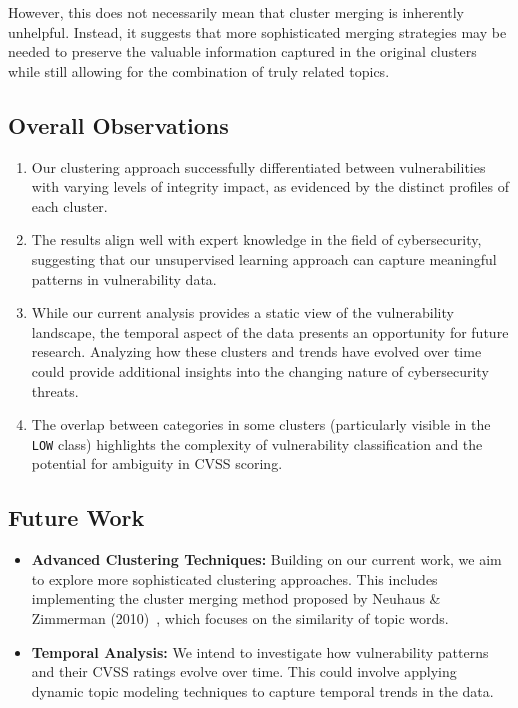 However, this does not necessarily mean that cluster merging is inherently unhelpful. Instead, it suggests that more sophisticated merging strategies may be needed to preserve the valuable information captured in the original clusters while still allowing for the combination of truly related topics.

\subsection{Overall Observations}

\begin{enumerate}
	\item Our clustering approach successfully differentiated between vulnerabilities with varying levels of integrity impact, as evidenced by the distinct profiles of each cluster.
	\item The results align well with expert knowledge in the field of cybersecurity, suggesting that our unsupervised learning approach can capture meaningful patterns in vulnerability data.
	\item While our current analysis provides a static view of the vulnerability landscape, the temporal aspect of the data presents an opportunity for future research. Analyzing how these clusters and trends have evolved over time could provide additional insights into the changing nature of cybersecurity threats.
	\item The overlap between categories in some clusters (particularly visible in the \texttt{LOW} class) highlights the complexity of vulnerability classification and the potential for ambiguity in CVSS scoring.
\end{enumerate}

\subsection{Future Work}

\begin{itemize}

	\item \textbf{Advanced Clustering Techniques:} Building on our current work, we aim to explore more sophisticated clustering approaches. This includes implementing the cluster merging method proposed by Neuhaus \& Zimmerman (2010)~\cite{cve_topic_modelling}, which focuses on the similarity of topic words.
	\item \textbf{Temporal Analysis:} We intend to investigate how vulnerability patterns and their CVSS ratings evolve over time. This could involve applying dynamic topic modeling techniques to capture temporal trends in the data.
\end{itemize}

